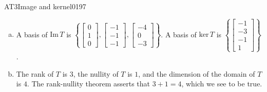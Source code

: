 \begin{exercise}{AT3}{Image and kernel}{0197}
\begin{exerciseAnswer}
\begin{enumerate}[(a)]
 
\item  

 A basis of \(\mathrm{Im}\,T\) is \(\left\{ \left[\begin{array}{c}
0 \\
1 \\
0
\end{array}\right] , \left[\begin{array}{c}
-1 \\
-1 \\
-1
\end{array}\right] , \left[\begin{array}{c}
-4 \\
0 \\
-3
\end{array}\right] \right\}\). A basis of \(\mathrm{ker}\,T\) is \(\left\{ \left[\begin{array}{c}
-1 \\
-3 \\
-1 \\
1
\end{array}\right] \right\}\). 

 
\item  

 The rank of \(T\) is \(3\), the nullity of \(T\) is \(1\), and the dimension of the domain of \(T\) is \(4\). The rank-nullity theorem asserts that \(3+1=4\), which we see to be true. 

 
\end{enumerate}

     \end{exerciseAnswer}
 \end{exercise}


\newpage





